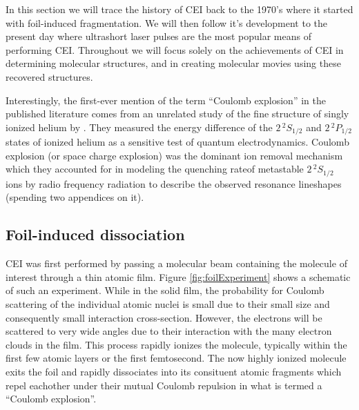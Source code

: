 
In this section we will trace the history of CEI back to the 1970's where it started with foil-induced fragmentation. We will then follow it's development to the present day where ultrashort laser pulses are the most popular means of performing CEI. Throughout we will focus solely on the achievements of CEI in determining molecular structures, and in creating molecular movies using these recovered structures.\footnotemark


Interestingly, the first-ever mention of the term ``Coulomb explosion'' in the published literature comes from an unrelated study of the fine structure of singly ionized helium by \citet{Novick55}. They measured the energy difference of the $2 \, ^2 S_{1/2}$ and $2 \, ^2 P_{1/2}$ states of ionized helium as a sensitive test of quantum electrodynamics. Coulomb explosion (or space charge explosion) was the dominant ion removal mechanism which they accounted for in modeling the quenching rate\footnotemark of metastable $2 \, ^2 S_{1/2}$ ions by radio frequency radiation to describe the observed resonance lineshapes (spending two appendices on it).


\subsection{Foil-induced dissociation}
CEI was first performed by passing a molecular beam containing the molecule of interest through a thin atomic film. Figure \ref{fig:foilExperiment} shows a schematic of such an experiment. While in the solid film, the probability for Coulomb scattering of the individual atomic nuclei is small due to their small size and consequently small interaction cross-section. However, the electrons will be scattered to very wide angles due to their interaction with the many electron clouds in the film. This process rapidly ionizes the molecule, typically within the first few atomic layers or the first femtosecond. The now highly ionized molecule exits the foil and rapidly dissociates into its consituent atomic fragments which repel eachother under their mutual Coulomb repulsion in what is termed a ``Coulomb explosion''.

